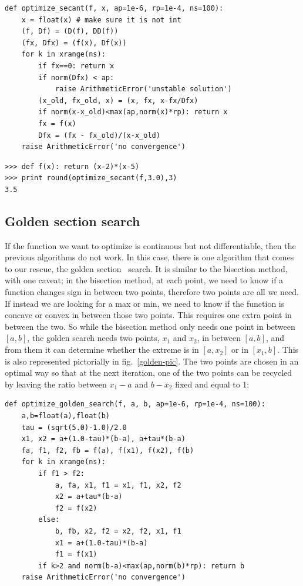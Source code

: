 \documentclass[justified,sixbynine]{tufte-book}
\def\ft{\small\tt}
\theoremstyle{plain}%
\theoremstyle{definition}
\theoremstyle{remark}
\begin{document}
\begin{fullwidth}
\begin{lstlisting}[caption={in file: {\ft nlib.py}}]
def optimize_secant(f, x, ap=1e-6, rp=1e-4, ns=100):
    x = float(x) # make sure it is not int
    (f, Df) = (D(f), DD(f))
    (fx, Dfx) = (f(x), Df(x))
    for k in xrange(ns):
        if fx==0: return x
        if norm(Dfx) < ap:
            raise ArithmeticError('unstable solution')
        (x_old, fx_old, x) = (x, fx, x-fx/Dfx)
        if norm(x-x_old)<max(ap,norm(x)*rp): return x
        fx = f(x)
        Dfx = (fx - fx_old)/(x-x_old)
    raise ArithmeticError('no convergence')
\end{lstlisting}

\begin{lstlisting}[caption={in file: {\ft nlib.py}}]
>>> def f(x): return (x-2)*(x-5)
>>> print round(optimize_secant(f,3.0),3)
3.5
\end{lstlisting}

\goodbreak\subsection{Golden section search}


If the function we want to optimize is continuous but not differentiable, then the previous algorithms do not work. In this case, there is one algorithm that comes to our rescue, the golden section~\cite{golden} search. It is similar to the bisection method, with one caveat; in the bisection method, at each point, we need to know if a function changes sign in between two points, therefore two points are all we need. If instead we are looking for a max or min, we need to know if the function is concave or convex in between those two points. This requires one extra point in between the two. So while the bisection method only needs one point in between $[a,b]$, the golden search needs two points, $x_1$ and $x_2$, in between $[a,b]$, and from them it can determine whether the extreme is in $[a,x_2]$ or in $[x_1,b]$. This is also represented pictorially in fig.~\ref{golden-pic}. The two points are chosen in an optimal way so that at the next iteration, one of the two points can be recycled by leaving the ratio between $x_1-a$ and $b-x_2$ fixed and equal to 1:

\begin{lstlisting}[caption={in file: {\ft nlib.py}}]
def optimize_golden_search(f, a, b, ap=1e-6, rp=1e-4, ns=100):
    a,b=float(a),float(b)
    tau = (sqrt(5.0)-1.0)/2.0
    x1, x2 = a+(1.0-tau)*(b-a), a+tau*(b-a)
    fa, f1, f2, fb = f(a), f(x1), f(x2), f(b)
    for k in xrange(ns):
        if f1 > f2:
            a, fa, x1, f1 = x1, f1, x2, f2
            x2 = a+tau*(b-a)
            f2 = f(x2)
        else:
            b, fb, x2, f2 = x2, f2, x1, f1
            x1 = a+(1.0-tau)*(b-a)
            f1 = f(x1)
        if k>2 and norm(b-a)<max(ap,norm(b)*rp): return b
    raise ArithmeticError('no convergence')
\end{lstlisting}


\end{fullwidth}
\end{document}
